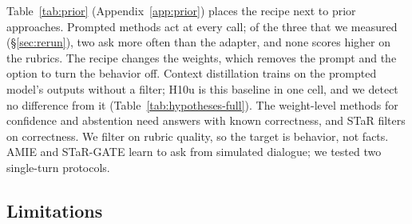 \documentclass{article}
\begin{document}
Table~\ref{tab:prior} (Appendix~\ref{app:prior}) places the recipe next to prior approaches.
Prompted methods \citep{tian2023just, li2024mediq} act at every call; of the three that we measured
(\S\ref{sec:rerun}), two ask more often than the adapter, and none scores higher on the rubrics. The
recipe changes the weights, which removes the prompt and the option to turn the behavior off. Context distillation \citep{askell2021general, snell2022learning} trains on the prompted model's
outputs without a filter; H10u is this baseline in one cell, and we detect no difference from it
(Table~\ref{tab:hypotheses-full}). The weight-level methods for confidence and abstention
\citep{lin2022teaching, zhang2024rtuning} need answers with known correctness, and STaR
\citep{zelikman2022star} filters on correctness. We filter on rubric quality, so the target is
behavior, not facts. AMIE \citep{tu2025amie} and STaR-GATE \citep{andukuri2024stargate} learn to
ask from simulated dialogue; we tested two single-turn protocols.

\subsection{Limitations}
\label{sec:limitations}
\end{document}

